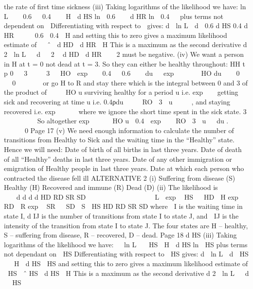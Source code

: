 \documentclass[a4paper,12pt]{article}
\begin{document}
\begin{enumerate}
the rate of first time sickness
(iii)
Taking logarithms of the likelihood we have:
ln L    0.6   0.4    H  d HS ln  0.6    d HR ln  0.4   plus terms not
dependent on 
Differentiating with respect to  gives:
d  ln L 
d 
0.6 d HS 0.4 d HR
  

0.6 
0.4 
H
and setting this to zero gives a maximum likelihood estimate of 
 ˆ 
d HD  d HR
 H
This is a maximum as the second derivative
d 2  ln L 
 d   2

d HD  d HR
   2
must
be negative.
(iv)
We want a person in H at t = 0 not dead at t = 3.
So they can either be healthy throughout:
HH
t p 0
  3
 
  3
 
HO
 exp    0.4   0.6    du   exp       HO du 
  0
 
  0
 




or go H to R and stay there which is the integral between
0 and 3 of the product of
 
 
HO
u
surviving healthy for a period u i.e. exp  
getting sick and recovering at time u i.e. 0.4ρdu
  

RO
 3  u     ,
and staying recovered i.e. exp    

where we ignore the short time spent in the sick state.
3
 
 
  

So altogether exp      HO u  0.4  exp    RO  3  u   du .
 
 
 
 

0
Page 17 %
(v)
We need enough information to calculate the number of transitions from
Healthy to Sick and the waiting time in the “Healthy” state. Hence we will
need:
Date of birth of all births in last three years.
Date of death of all “Healthy” deaths in last three years.
Date of any other immigration or emigration of Healthy people in last three
years.
Date at which each person who contracted the disease fell ill
ALTERNATIVE 2
(i)
Suffering
from
disease
(S)
Healthy
(H)
Recovered and
immune
(R)
Dead
(D)
(ii)
The likelihood is
 
       
d
d
d
d
HD
RD
SR
SD




       
   
L  exp  HS   HD  H exp  RD  R exp  SR   SD  S  HS
HD
RD
SR
SD
where
 I is the waiting time in state I,
d IJ is the number of transitions from state I to state J,
and  IJ is the intensity of the transition from state I to state J.
The four states are H – healthy, S – suffering from disease,
R – recovered, D – dead.
Page 18
d HS %
(iii)
Taking logarithms of the likelihood we have:
 
ln L   HS  H  d HS ln  HS
plus terms not dependant on  HS
Differentiating with respect to  HS gives:
d  ln L 
d  HS
  H 
d HS
 HS
and setting this to zero gives a maximum likelihood estimate of  HS
 ˆ
HS

d HS
 H
This is a maximum as the second derivative
d 2  ln L 
 d  
HS

\end{enumerate}
\end{document}

